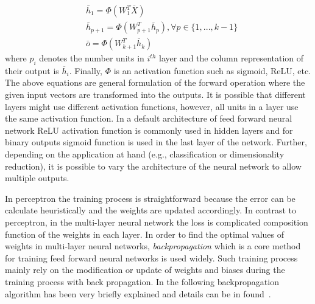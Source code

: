 \begin{align*}
& \bar{h}_1= \Phi (W_1^{T} \overline{X}) \\
& \bar{h}_{p+1}= \Phi (W_{p+1}^{T} \overline{h}_p), \forall p \in \{1,...,k-1\} \\
& \bar{o}=\Phi (W_{k+1}^{T} \overline{h}_k)
\end{align*}
where $p_i$ denotes the number units in $i^{th}$ layer and the column representation of their output is $\overline{h}_i$. Finally, $\Phi$ is an activation function such as sigmoid, ReLU, etc. The above equations are general formulation of the forward operation where the given input vectors are transformed into the outputs. It is possible that different layers might use different activation functions, however,  all units in a layer use the same activation function. 
In a default architecture of feed forward neural network ReLU activation function is commonly used in hidden layers and for binary outputs sigmoid function is used in the last layer of the network. %
Further, depending on the application at hand (e.g., classification or dimensionality reduction), it is possible to vary the architecture of the neural network to allow multiple outputs. 




In perceptron the training process is straightforward because the error can be calculate heuristically and the weights are updated accordingly. In contrast to perceptron, in the multi-layer neural network the loss is complicated composition function of the weights in each layer. In order to find the optimal values of weights in multi-layer neural networks, \textit{backpropagation} which is a core method for training feed forward neural networks is used widely.
Such training process mainly rely on the modification or update of weights and biases during the training process with back propagation. In the following backpropagation algorithm has been very briefly explained and details can be in  found~\cite{DBLP:series/utcs/Skansi18}. 


